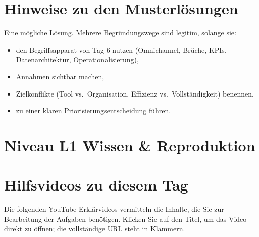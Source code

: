 \documentclass[11pt,a4paper,oneside]{article}
\begin{document}
\section*{Hinweise zu den Musterlösungen}
\thispagestyle{plain}

\noindent Eine mögliche Lösung. Mehrere Begründungswege sind legitim, solange sie:

\begin{itemize}
  \item den Begriffsapparat von Tag 6 nutzen (Omnichannel, Brüche, KPIs, Datenarchitektur, Operationalisierung),
  \item Annahmen sichtbar machen,
  \item Zielkonflikte (Tool vs.\ Organisation, Effizienz vs.\ Vollständigkeit) benennen,
  \item zu einer klaren Priorisierungsentscheidung führen.
\end{itemize}

\clearpage

\section*{Niveau L1 \textendash{} Wissen \& Reproduktion}

\section*{Hilfsvideos zu diesem Tag}
\thispagestyle{plain}

\noindent Die folgenden YouTube-Erkl\"arvideos vermitteln die Inhalte, die Sie zur Bearbeitung der Aufgaben ben\"otigen. Klicken Sie auf den Titel, um das Video direkt zu \"offnen; die vollst\"andige URL steht in Klammern.
\end{document}
